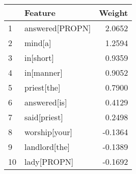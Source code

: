 \begin{tabular}{llr}
\toprule
{} &          Feature &  Weight \\
\midrule
1  &  answered[PROPN] &  2.0652 \\
2  &          mind[a] &  1.2594 \\
3  &        in[short] &  0.9359 \\
4  &       in[manner] &  0.9052 \\
5  &      priest[the] &  0.7900 \\
6  &     answered[is] &  0.4129 \\
7  &     said[priest] &  0.2498 \\
8  &    worship[your] & -0.1364 \\
9  &    landlord[the] & -0.1389 \\
10 &      lady[PROPN] & -0.1692 \\
\bottomrule
\end{tabular}
